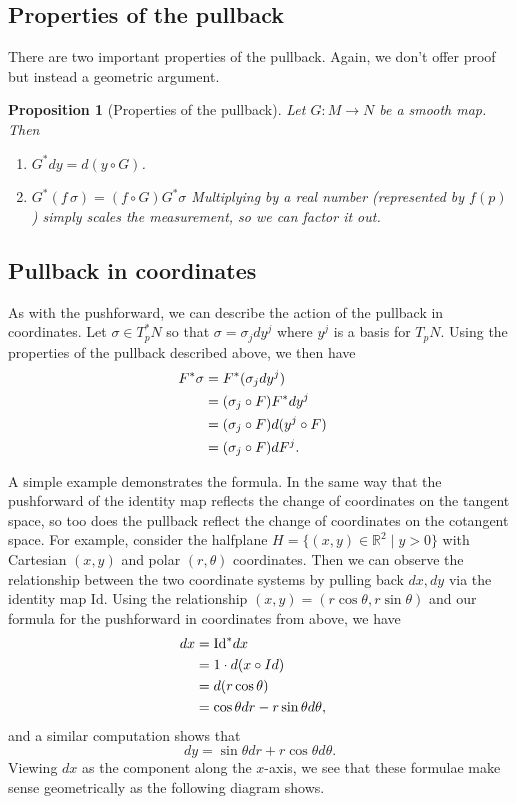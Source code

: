 \documentclass[12pt,letterpaper,boxed]{article}
\newtheorem{proposition}[theorem]{Proposition}
\newcommand{\R}{{\mathbb{R}}}
\begin{document}
\subsection{Properties of the pullback}
There are two important properties of the pullback. Again, we don't offer proof but instead a geometric argument.

\begin{proposition}[Properties of the pullback]
	Let $G : M \to N$ be a smooth map. Then
	\begin{enumerate}
		\item $G^* dy = d(y \circ G)$.

		\item $G^* (f \, \sigma) = (f \circ G) G^* \sigma$
			Multiplying by a real number (represented by $f(p)$) simply scales the measurement, so we can factor it out.
	\end{enumerate}
\end{proposition}

\subsection{Pullback in coordinates}
As with the pushforward, we can describe the action of the pullback in coordinates. Let $\sigma \in T_p^* N$ so that $\sigma = \sigma_j dy^j$ where $y^j$ is a basis for $T_p N$. Using the properties of the pullback described above, we then have
\[
	\begin{aligned}
		F^* \sigma &= F^* (\sigma_j dy^j) \cr
			   &= (\sigma_j \circ F) F^* dy^j \cr
			   &= (\sigma_j \circ F) d(y^j \circ F) \cr
			   &= (\sigma_j \circ F) dF^j.
	\end{aligned}
\]

A simple example demonstrates the formula. In the same way that the pushforward of the identity map reflects the change of coordinates on the tangent space, so too does the pullback reflect the change of coordinates on the cotangent space. For example, consider the halfplane $H = \{ (x, y) \in \R^2 \mid y > 0 \}$ with Cartesian $(x,y)$ and polar $(r, \theta)$ coordinates. Then we can observe the relationship between the two coordinate systems by pulling back $dx, dy$ via the identity map $\textrm{Id}$. Using the relationship $(x, y) = (r \cos \theta, r \sin \theta)$ and our formula for the pushforward in coordinates from above, we have
\[
	\begin{aligned}
		dx &= \textrm{Id}^* dx \cr
		   &= 1 \cdot d(x \circ Id) \cr
		   &= d(r \cos \theta) \cr
		   &= \cos \theta dr - r \sin \theta d\theta,
	\end{aligned}
\]
and a similar computation shows that
\[
	dy = \sin \theta dr + r \cos \theta d \theta.
\]
Viewing $dx$ as the component along the $x$-axis, we see that these formulae make sense geometrically as the following diagram shows.
\end{document}
